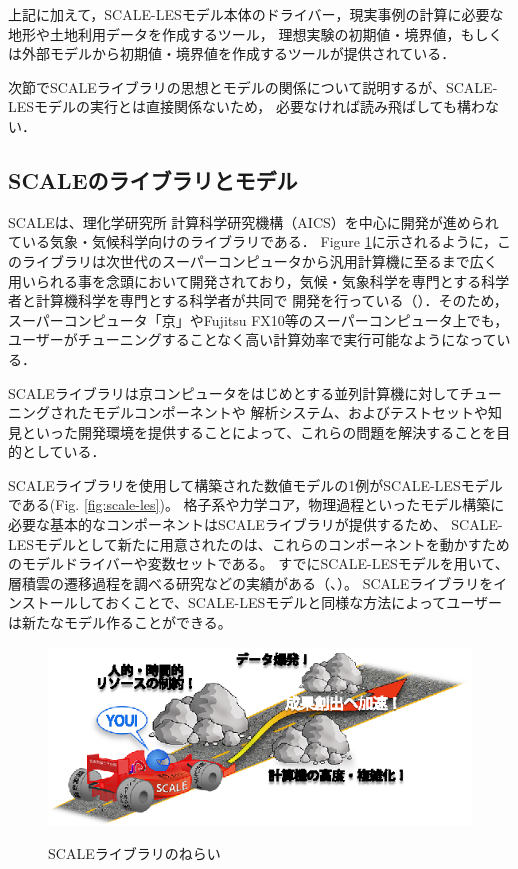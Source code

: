 上記に加えて，SCALE-LESモデル本体のドライバー，現実事例の計算に必要な地形や土地利用データを作成するツール，
理想実験の初期値・境界値，もしくは外部モデルから初期値・境界値を作成するツールが提供されている．

次節でSCALEライブラリの思想とモデルの関係について説明するが、SCALE-LESモデルの実行とは直接関係ないため，
必要なければ読み飛ばしても構わない．


\subsection{SCALEのライブラリとモデル}
SCALEは、理化学研究所 計算科学研究機構（AICS）を中心に開発が進められている気象・気候科学向けのライブラリである．
Figure \ref{fig:scale}に示されるように，このライブラリは次世代のスーパーコンピュータから汎用計算機に至るまで広く
用いられる事を念頭において開発されており，気候・気象科学を専門とする科学者と計算機科学を専門とする科学者が共同で
開発を行っている（\cite{abe_etal_2013}）．そのため，スーパーコンピュータ「京」やFujitsu FX10等のスーパーコンピュータ上でも，
ユーザーがチューニングすることなく高い計算効率で実行可能なようになっている．

SCALEライブラリは京コンピュータをはじめとする並列計算機に対してチューニングされたモデルコンポーネントや
解析システム、およびテストセットや知見といった開発環境を提供することによって、これらの問題を解決することを目的としている．

SCALEライブラリを使用して構築された数値モデルの1例がSCALE-LESモデルである(Fig. \ref{fig:scale-les})。
格子系や力学コア，物理過程といったモデル構築に必要な基本的なコンポーネントはSCALEライブラリが提供するため、
SCALE-LESモデルとして新たに用意されたのは、これらのコンポーネントを動かすためのモデルドライバーや変数セットである。
すでにSCALE-LESモデルを用いて、層積雲の遷移過程を調べる研究などの実績がある（\cite{satoy_2014}、\cite{satoy_2015}）。
SCALEライブラリをインストールしておくことで、SCALE-LESモデルと同様な方法によってユーザーは新たなモデル作ることができる。


\begin{figure}[t]
\begin{center}
  \includegraphics[width=0.9\hsize]{./figure/library.eps}\\
  \caption{SCALEライブラリのねらい}
  \label{fig:scale}
\end{center}
\end{figure}


